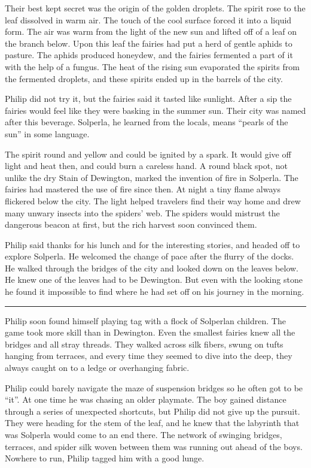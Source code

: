 \documentclass[10pt, draft]{memoir}
\renewcommand{\pfbreakdisplay}{\bigskip \ding{166} \bigskip}
\newcommand{\secbreak}{\fancybreak{\pfbreakdisplay}}
\begin{document}
Their best kept secret was the origin of the golden droplets. The spirit rose to the leaf dissolved in warm air. The touch of the cool surface forced it into a liquid form. The air was warm from the light of the new sun and lifted off of a leaf on the branch below. Upon this leaf the fairies had put a herd of gentle aphids to pasture. The aphids produced honeydew, and the fairies fermented a part of it with the help of a fungus. The heat of the rising sun evaporated the spirits from the fermented droplets, and these spirits ended up in the barrels of the city.

Philip did not try it, but the fairies said it tasted like sunlight. After a sip the fairies would feel like they were basking in the summer sun. Their city was named after this beverage. Solperla, he learned from the locals, means ``pearls of the sun'' in some language.

The spirit round and yellow and could be ignited by a spark. It would give off light and heat then, and could burn a careless hand. A round black spot, not unlike the dry Stain of Dewington, marked the invention of fire in Solperla. The fairies had mastered the use of fire since then. At night a tiny flame always flickered below the city. The light helped travelers find their way home and drew many unwary insects into the spiders' web. The spiders would mistrust the dangerous beacon at first, but the rich harvest soon convinced them.

Philip said thanks for his lunch and for the interesting stories, and headed off to explore Solperla. He welcomed the change of pace after the flurry of the docks. He walked through the bridges of the city and looked down on the leaves below. He knew one of the leaves had to be Dewington. But even with the looking stone he found it impossible to find where he had set off on his journey in the morning.

\secbreak

Philip soon found himself playing tag with a flock of Solperlan children. The game took more skill than in Dewington. Even the smallest fairies knew all the bridges and all stray threads. They walked across silk fibers, swung on tufts hanging from terraces, and every time they seemed to dive into the deep, they always caught on to a ledge or overhanging fabric.

Philip could barely navigate the maze of suspension bridges so he often got to be ``it''. At one time he was chasing an older playmate. The boy gained distance through a series of unexpected shortcuts, but Philip did not give up the pursuit. They were heading for the stem of the leaf, and he knew that the labyrinth that was Solperla would come to an end there. The network of swinging bridges, terraces, and spider silk woven between them was running out ahead of the boys. Nowhere to run, Philip tagged him with a good lunge.
\end{document}
